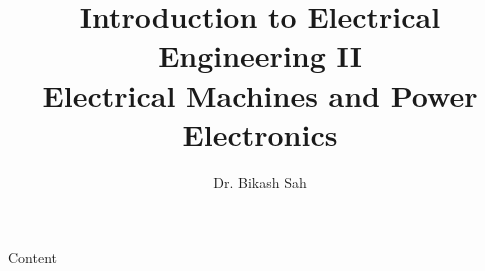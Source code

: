 \documentclass{../course_template/lectureClass}
\begin{document}

\title[Introduction to Electrical Engineering II]{Introduction to Electrical Engineering II \\ Electrical Machines and Power Electronics}
\author{Dr. Bikash Sah}
\date{}
\begin{frame}[plain]
    \titlepage
\end{frame}

\begin{frame}{Content}
    \tableofcontents
\end{frame}


%

\end{document}
